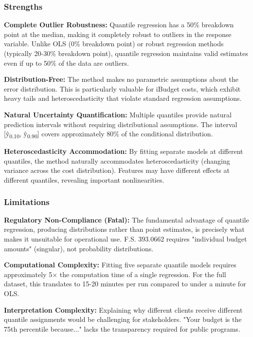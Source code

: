 \subsubsection{Strengths}

\textbf{Complete Outlier Robustness:}
Quantile regression has a 50\% breakdown point at the median, making it completely robust to outliers in the response variable. Unlike OLS (0\% breakdown point) or robust regression methods (typically 20-30\% breakdown point), quantile regression maintains valid estimates even if up to 50\% of the data are outliers.

\textbf{Distribution-Free:}
The method makes no parametric assumptions about the error distribution. This is particularly valuable for iBudget costs, which exhibit heavy tails and heteroscedasticity that violate standard regression assumptions.

\textbf{Natural Uncertainty Quantification:}
Multiple quantiles provide natural prediction intervals without requiring distributional assumptions. The interval [\^{y}\textsubscript{0.10}, \^{y}\textsubscript{0.90}] covers approximately 80\% of the conditional distribution.

\textbf{Heteroscedasticity Accommodation:}
By fitting separate models at different quantiles, the method naturally accommodates heteroscedasticity (changing variance across the cost distribution). Features may have different effects at different quantiles, revealing important nonlinearities.

\subsubsection{Limitations}

\textbf{Regulatory Non-Compliance (Fatal):}
The fundamental advantage of quantile regression, producing distributions rather than point estimates, is precisely what makes it unsuitable for operational use. F.S. 393.0662 requires "individual budget amounts" (singular), not probability distributions.

\textbf{Computational Complexity:}
Fitting five separate quantile models requires approximately 5× the computation time of a single regression. For the full dataset, this translates to 15-20 minutes per run compared to under a minute for OLS.

\textbf{Interpretation Complexity:}
Explaining why different clients receive different quantile assignments would be challenging for stakeholders. "Your budget is the 75th percentile because..." lacks the transparency required for public programs.


